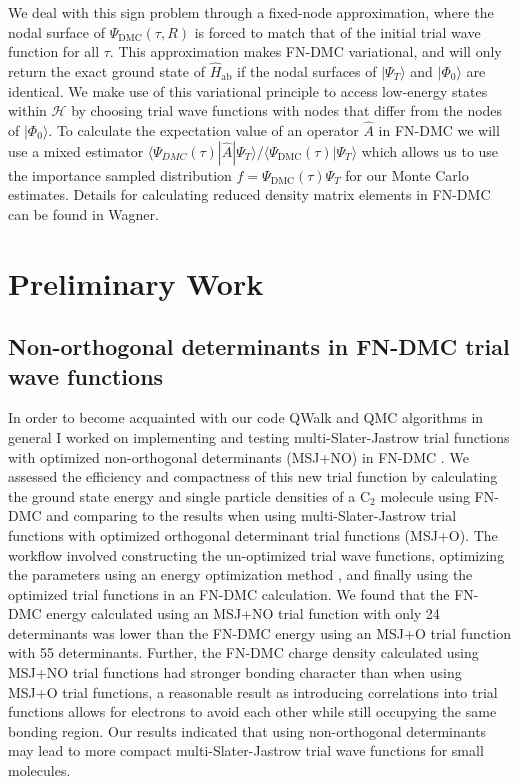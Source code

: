 \documentclass{article}
\begin{document}
We deal with this sign problem through a fixed-node approximation, where the nodal surface of $\Psi_\text{DMC}(\tau, R)$ is forced to match that of the initial trial wave function for all $\tau$.
This approximation makes FN-DMC variational, and will only return the exact ground state of $\hat{H}_\text{ab}$ if the nodal surfaces of $|\Psi_T\rangle$ and $|\Phi_0\rangle$ are identical.
We make use of this variational principle to access low-energy states within $\mathcal{H}$ by choosing trial wave functions with nodes that differ from the nodes of $|\Phi_0 \rangle$.
To calculate the expectation value of an operator $\hat{A}$ in FN-DMC we will use a mixed estimator $\langle \Psi_{DMC}(\tau) |\hat{A} | \Psi_T \rangle/\langle \Psi_\text{DMC}(\tau) | \Psi_T \rangle$ which allows us to use the importance sampled distribution $f = \Psi_\text{DMC}(\tau)\Psi_T$ for our Monte Carlo estimates.
Details for calculating reduced density matrix elements in FN-DMC can be found in Wagner.

\pagebreak
\section{Preliminary Work}
\subsection{Non-orthogonal determinants in FN-DMC trial wave functions}
In order to become acquainted with our code QWalk \cite{WAGNER20093390} and QMC algorithms in general I worked on implementing and testing multi-Slater-Jastrow trial functions with optimized non-orthogonal determinants (MSJ+NO) in FN-DMC \cite{Pathak2018}.
We assessed the efficiency and compactness of this new trial function by calculating the ground state energy and single particle densities of a C$_2$ molecule using FN-DMC and comparing to the results when using multi-Slater-Jastrow trial functions with optimized orthogonal determinant trial functions (MSJ+O). 
The workflow involved constructing the un-optimized trial wave functions, optimizing the parameters using an energy optimization method \cite{Toulouse2007}, and finally using the optimized trial functions in an FN-DMC calculation. 
We found that the FN-DMC energy calculated using an MSJ+NO trial function with only 24 determinants was lower than the FN-DMC energy using an MSJ+O trial function with 55 determinants. 
Further, the FN-DMC charge density calculated using MSJ+NO trial functions had stronger bonding character than when using MSJ+O trial functions, a reasonable result as introducing correlations into trial functions allows for electrons to avoid each other while still occupying the same bonding region. 
Our results indicated that using non-orthogonal determinants may lead to more compact multi-Slater-Jastrow trial wave functions for small molecules.
\end{document}
